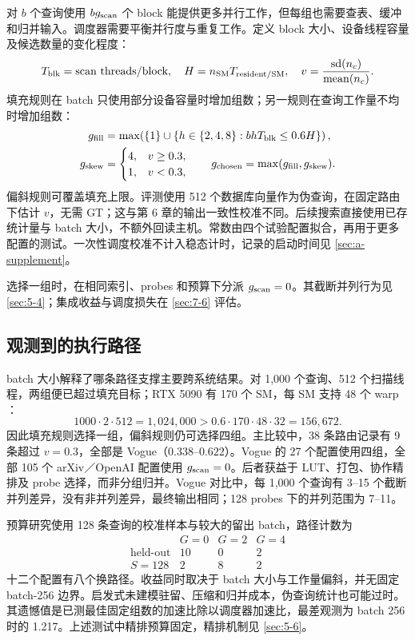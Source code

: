 对 $b$ 个查询使用 $bg_{\mathrm{scan}}$ 个 block 能提供更多并行工作，但每组也需要查表、缓冲和归并输入。调度器需要平衡并行度与重复工作。定义 block 大小、设备线程容量及候选数量的变化程度：
\[
 T_{\rm blk}=\text{scan threads/block},\quad
 H=n_{\rm SM}T_{\rm resident/SM},\quad
 v=\frac{\operatorname{sd}(n_c)}{\operatorname{mean}(n_c)}.
\]
填充规则在 batch 只使用部分设备容量时增加组数；另一规则在查询工作量不均时增加组数：
\begin{align}
 g_{\rm fill}
 &=\max\!\left(\{1\}\cup
       \{h\in\{2,4,8\}:bhT_{\rm blk}\leq0.6H\}\right),
       \label{eq:5-fill-rule}\\
 g_{\rm skew}&=
   \begin{cases}4,&v\geq0.3,\\1,&v<0.3,\end{cases}
 \qquad
 g_{\rm chosen}=\max(g_{\rm fill},g_{\rm skew}).
 \label{eq:5-skew-rule}
\end{align}
偏斜规则可覆盖填充上限。评测使用 512 个数据库向量作为伪查询，在固定路由下估计 $v$，无需 GT；这与第 6 章的输出一致性校准不同。后续搜索直接使用已存统计量与 batch 大小，不额外回读主机。常数由四个试验配置拟合，再用于更多配置的测试。一次性调度校准不计入稳态计时，记录的启动时间见 \cref{sec:a-supplement}。

选择一组时，在相同索引、probes 和预算下分派 $g_{\mathrm{scan}}=0$。其截断并列行为见 \cref{sec:5-4}；集成收益与调度损失在 \cref{sec:7-6} 评估。

\subsection{观测到的执行路径}

batch 大小解释了哪条路径支撑主要跨系统结果。对 1,000 个查询、512 个扫描线程，两组便已超过填充目标；RTX 5090 有 170 个 SM，每 SM 支持 48 个 warp \cite{blackwell_tuning}：
\[
 1000\cdot2\cdot512=1{,}024{,}000
 >0.6\cdot170\cdot48\cdot32=156{,}672.
\]
因此填充规则选择一组，偏斜规则仍可选择四组。主比较中，38 条路由记录有 9 条超过 $v=0.3$，全部是 Vogue（$0.338$--$0.622$）。Vogue 的 27 个配置使用四组，全部 105 个 arXiv／OpenAI 配置使用 $g_{\mathrm{scan}}=0$。后者获益于 LUT、打包、协作精排及 probe 选择，而非分组归并。Vogue 对比中，每 1,000 个查询有 3--15 个截断并列差异，没有非并列差异，最终输出相同；128 probes 下的并列范围为 7--11。

预算研究使用 128 条查询的校准样本与较大的留出 batch，路径计数为
\[
 \begin{array}{c|rrr}
 &G=0&G=2&G=4\\\hline
 \text{held-out}&10&0&2\\
 S=128&2&8&2
 \end{array}
\]
十二个配置有八个换路径。收益同时取决于 batch 大小与工作量偏斜，并无固定 batch-256 边界。启发式未建模驻留、压缩和归并成本，伪查询统计也可能过时。其遗憾值是已测最佳固定组数的加速比除以调度器加速比，最差观测为 batch 256 时的 1.217。上述测试中精排预算固定，精排机制见 \cref{sec:5-6}。
